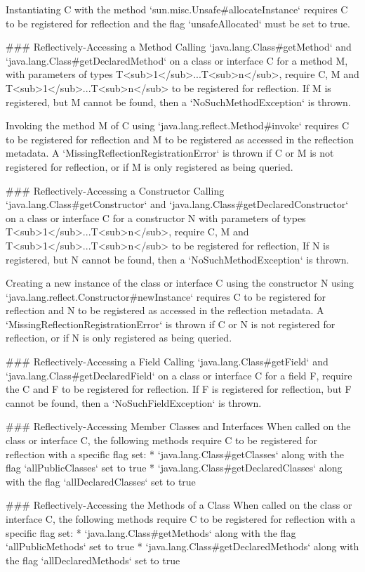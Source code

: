 Instantiating C with the method `sun.misc.Unsafe#allocateInstance` requires C to be 
registered for reflection and the flag `unsafeAllocated` must be set to true.

### Reflectively-Accessing a Method
Calling `java.lang.Class#getMethod` and `java.lang.Class#getDeclaredMethod` on a class or interface C for a method M, 
with parameters of types T<sub>1</sub>...T<sub>n</sub>, require C, M and T<sub>1</sub>...T<sub>n</sub> to be registered 
for reflection.
If M is registered, but M cannot be found, then a `NoSuchMethodException` is thrown.

Invoking the method M of C using `java.lang.reflect.Method#invoke` requires C to be registered for reflection
and M to be registered as accessed in the reflection metadata.
A `MissingReflectionRegistrationError` is thrown if C or M is not registered for reflection, or 
if M is only registered as being queried.

### Reflectively-Accessing a Constructor
Calling `java.lang.Class#getConstructor` and `java.lang.Class#getDeclaredConstructor` on a class or interface C 
for a constructor N with parameters of types T<sub>1</sub>...T<sub>n</sub>, require C, M and T<sub>1</sub>...T<sub>n</sub>
to be registered for reflection,
If N is registered, but N cannot be found, then a `NoSuchMethodException` is thrown.

Creating a new instance of the class or interface C using the constructor N using
`java.lang.reflect.Constructor#newInstance` requires C to be registered for reflection
and N to be registered as accessed in the reflection metadata.
A `MissingReflectionRegistrationError` is thrown if C or N is not registered for reflection, or
if N is only registered as being queried.

### Reflectively-Accessing a Field
Calling `java.lang.Class#getField` and `java.lang.Class#getDeclaredField` on a class or interface C for a field F,
require the C and F to be registered for reflection.
If F is registered for reflection, but F cannot be found, then a `NoSuchFieldException` is thrown.

### Reflectively-Accessing Member Classes and Interfaces
When called on the class or interface C, the following methods require C to be registered for reflection with
a specific flag set:
* `java.lang.Class#getClasses` along with the flag `allPublicClasses` set to true
* `java.lang.Class#getDeclaredClasses` along with the flag `allDeclaredClasses` set to true

### Reflectively-Accessing the Methods of a Class
When called on the class or interface C, the following methods require C to be registered for reflection with 
a specific flag set:
* `java.lang.Class#getMethods` along with the flag `allPublicMethods` set to true
* `java.lang.Class#getDeclaredMethods` along with the flag `allDeclaredMethods` set to true

